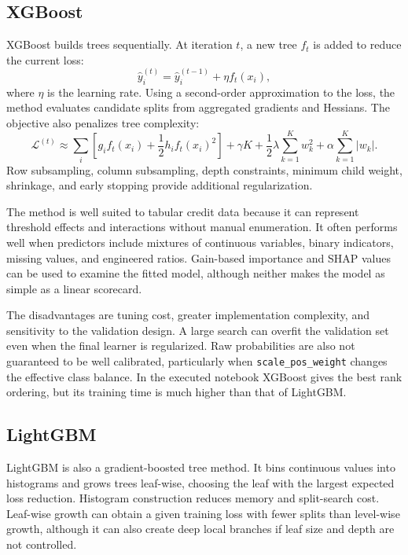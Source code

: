 \documentclass[11pt]{article}
\begin{document}
\subsection{XGBoost}
XGBoost builds trees sequentially. At iteration $t$, a new tree $f_t$ is added to reduce the current loss:
\begin{equation}
\hat y_i^{(t)}=\hat y_i^{(t-1)}+\eta f_t(x_i),
\end{equation}
where $\eta$ is the learning rate. Using a second-order approximation to the loss, the method evaluates candidate splits from aggregated gradients and Hessians. The objective also penalizes tree complexity:
\begin{equation}
\mathcal L^{(t)}\approx\sum_i\left[g_i f_t(x_i)+\frac{1}{2}h_i f_t(x_i)^2\right]
+\gamma K+\frac{1}{2}\lambda\sum_{k=1}^{K}w_k^2+\alpha\sum_{k=1}^{K}|w_k|.
\end{equation}
Row subsampling, column subsampling, depth constraints, minimum child weight, shrinkage, and early stopping provide additional regularization.

The method is well suited to tabular credit data because it can represent threshold effects and interactions without manual enumeration. It often performs well when predictors include mixtures of continuous variables, binary indicators, missing values, and engineered ratios. Gain-based importance and SHAP values can be used to examine the fitted model, although neither makes the model as simple as a linear scorecard.

The disadvantages are tuning cost, greater implementation complexity, and sensitivity to the validation design. A large search can overfit the validation set even when the final learner is regularized. Raw probabilities are also not guaranteed to be well calibrated, particularly when \texttt{scale\_pos\_weight} changes the effective class balance. In the executed notebook XGBoost gives the best rank ordering, but its training time is much higher than that of LightGBM.

\subsection{LightGBM}
LightGBM is also a gradient-boosted tree method. It bins continuous values into histograms and grows trees leaf-wise, choosing the leaf with the largest expected loss reduction. Histogram construction reduces memory and split-search cost. Leaf-wise growth can obtain a given training loss with fewer splits than level-wise growth, although it can also create deep local branches if leaf size and depth are not controlled.
\end{document}
